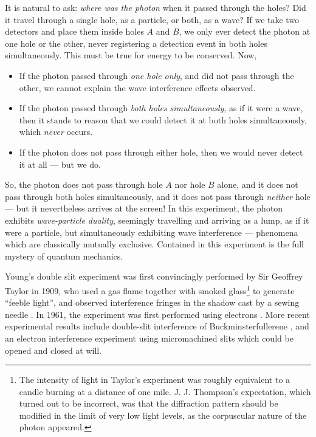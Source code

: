 It is natural to ask: \emph{where was the photon} when it passed through the holes? Did it travel through a single hole, as a particle, or both, as a wave? If we take two detectors and place them inside holes $A$ and $B$, we only ever detect the photon at one hole or the other, never registering a detection event in both holes simultaneously. This must be true for energy to be conserved. 
Now,
\begin{itemize}
    \item If the photon passed through \emph{one hole only}, and did not pass through the other, we cannot explain the wave interference effects observed.
    \item If the photon passed through \emph{both holes simultaneously}, as if it were a wave, then it stands to reason that we could detect it at both holes simultaneously,  which \emph{never} occurs.
    \item If the photon does not pass through either hole, then we would never detect it at all --- but we do.
\end{itemize}
So, the photon does not pass through hole $A$ nor hole $B$ alone, and it does not pass through both holes simultaneously, and it does not pass through \emph{neither} hole --- but it nevertheless arrives at the screen! In this experiment, the photon exhibits \emph{wave-particle duality}, seemingly travelling and arriving as a lump, as if it were a particle, but simultaneously exhibiting wave interference --- phenomena which are classically mutually exclusive.  Contained in this experiment is the full mystery of quantum mechanics.

Young's double slit experiment was first convincingly performed by Sir Geoffrey Taylor in 1909, who used a gas flame together with smoked glass\footnote{The intensity of light in Taylor's experiment was roughly equivalent to a candle burning at a distance of one mile. J. J. Thompson's expectation, which turned out to be incorrect, was that the diffraction pattern should be modified in the limit of very low light levels, as the corpuscular nature of the photon appeared.}
to generate ``feeble light'', and observed interference fringes in the shadow cast by a sewing needle \cite{Taylor1909}. In 1961, the experiment was first performed using electrons \cite{Jonsson1974}. More recent experimental results include double-slit interference of Buckminsterfullerene \cite{Arndt1999}, and an electron interference experiment using micromachined slits \cite{Bach2013} which could be opened and closed at will.

